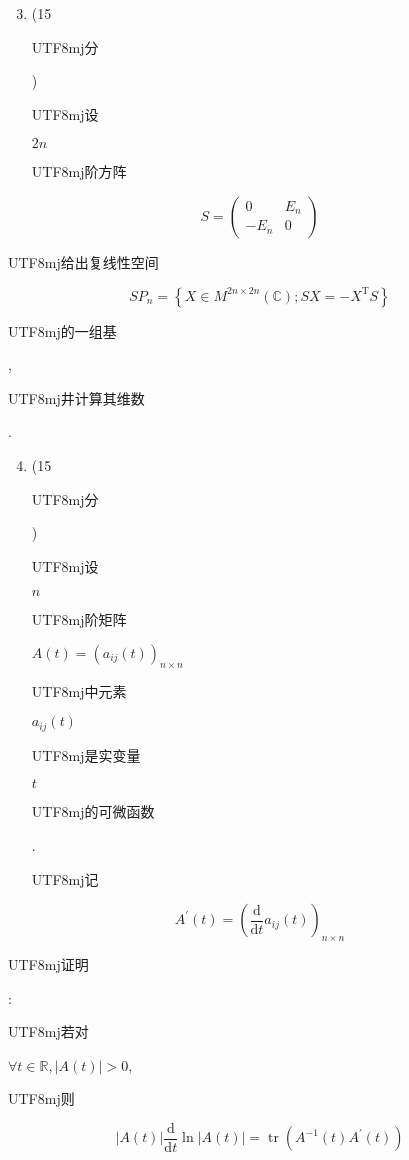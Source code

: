 \documentclass[10pt]{article}
\begin{document}
\begin{enumerate}
  \setcounter{enumi}{2}
  \item (15 \begin{CJK}{UTF8}{mj}分\end{CJK}) \begin{CJK}{UTF8}{mj}设\end{CJK} $2 n$ \begin{CJK}{UTF8}{mj}阶方阵\end{CJK}
\end{enumerate}
$$
S=\left(\begin{array}{cc}
0 & E_{n} \\
-E_{n} & 0
\end{array}\right)
$$
\begin{CJK}{UTF8}{mj}给出复线性空间\end{CJK}
$$
S P_{n}=\left\{X \in M^{2 n \times 2 n}(\mathbb{C}) ; S X=-X^{\mathrm{T}} S\right\}
$$
\begin{CJK}{UTF8}{mj}的一组基\end{CJK}, \begin{CJK}{UTF8}{mj}井计算其维数\end{CJK}.

\begin{enumerate}
  \setcounter{enumi}{3}
  \item (15 \begin{CJK}{UTF8}{mj}分\end{CJK}) \begin{CJK}{UTF8}{mj}设\end{CJK} $n$ \begin{CJK}{UTF8}{mj}阶矩阵\end{CJK} $A(t)=\left(a_{i j}(t)\right)_{n \times n}$ \begin{CJK}{UTF8}{mj}中元素\end{CJK} $a_{i j}(t)$ \begin{CJK}{UTF8}{mj}是实变量\end{CJK} $t$ \begin{CJK}{UTF8}{mj}的可微函数\end{CJK}. \begin{CJK}{UTF8}{mj}记\end{CJK}
\end{enumerate}
$$
A^{\prime}(t)=\left(\frac{\mathrm{d}}{\mathrm{d} t} a_{i j}(t)\right)_{n \times n}
$$
\begin{CJK}{UTF8}{mj}证明\end{CJK}: \begin{CJK}{UTF8}{mj}若对\end{CJK} $\forall t \in \mathbb{R},|A(t)|>0$, \begin{CJK}{UTF8}{mj}则\end{CJK}
$$
|A(t)| \frac{\mathrm{d}}{\mathrm{d} t} \ln |A(t)|=\operatorname{tr}\left(A^{-1}(t) A^{\prime}(t)\right)
$$
\end{document}
